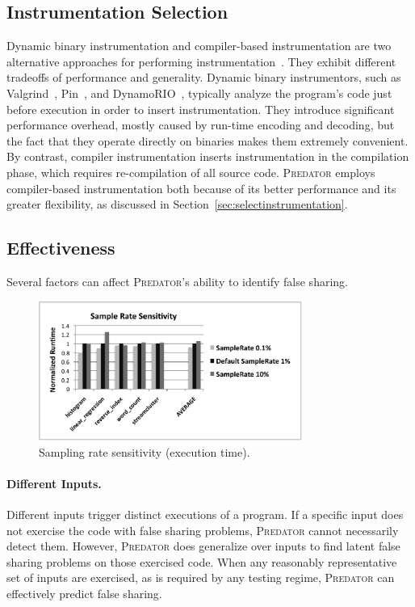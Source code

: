 \documentclass[10pt]{sigplanconf}
\newcommand{\Predator}{{\scshape Predator}}
\begin{document}
\subsection{Instrumentation Selection}
\label{sec:instrumentationtradeoff}
Dynamic binary instrumentation and compiler-based instrumentation are two alternative approaches for performing instrumentation~\cite{Instrumentation}. They exhibit different tradeoffs of performance and generality. Dynamic binary instrumentors, such as Valgrind~\cite{Valgrind}, Pin~\cite{Pin}, and DynamoRIO~\cite{DynamoRIO}, typically analyze the program's code just before execution in order to insert instrumentation. They introduce significant performance overhead, mostly caused by run-time encoding and decoding, but the fact that they operate directly on binaries makes them extremely convenient. By contrast, compiler instrumentation inserts instrumentation in the compilation phase, which requires re-compilation of all source code. 
\Predator{} employs compiler-based instrumentation both because of its better performance and its greater flexibility, as discussed in Section~\ref{sec:selectinstrumentation}.

\subsection{Effectiveness}
Several factors can affect \Predator{}'s ability to identify false sharing.

\begin{figure}[!t]
\centering 
\includegraphics[width=3.4in]{fig/sample}
\caption{Sampling rate sensitivity (execution time).}
\label{fig:sample}
\end{figure}

\paragraph{Different Inputs.} Different inputs trigger distinct executions of a program. If a specific input does not exercise the code with false sharing problems, \Predator{} cannot necessarily detect them. However, \Predator{} does generalize over inputs to find latent false sharing problems on those exercised code. When any reasonably representative set of inputs are exercised, as is required by any testing regime, \Predator{} can effectively predict false sharing.
\end{document}
